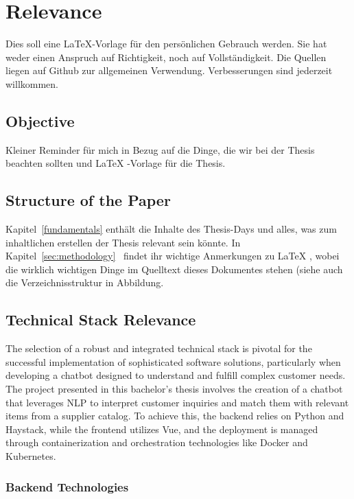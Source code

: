 \section{Relevance}\label{sec:Relevance}
Dies soll eine \LaTeX{}-Vorlage für den persönlichen Gebrauch werden. Sie hat weder einen Anspruch auf Richtigkeit, noch
auf Vollständigkeit. Die Quellen liegen auf Github zur allgemeinen Verwendung. Verbesserungen sind jederzeit willkommen.

\subsection{Objective}\label{subsec:objective}
Kleiner Reminder für mich in Bezug auf die Dinge, die wir bei der Thesis beachten sollten und \LaTeX{}
-Vorlage für die Thesis.

\subsection{Structure of the Paper}\label{subsec:structure-of-the-paper}
Kapitel~\ref{fundamentals}
enthält die Inhalte des Thesis-Days und alles, was zum inhaltlichen erstellen der Thesis relevant sein könnte.
In
Kapitel~\ref{sec:methodology}~ findet ihr wichtige Anmerkungen zu \LaTeX{}
, wobei die wirklich wichtigen Dinge im Quelltext dieses Dokumentes stehen (siehe auch die Verzeichnisstruktur in
Abbildung.

\subsection{Technical Stack Relevance}\label{subsec:technical-stack-relevance}

The selection of a robust and integrated technical stack is pivotal for the successful implementation of sophisticated
software solutions, particularly when developing a chatbot designed to understand and fulfill complex customer needs.
The project presented in this bachelor’s thesis involves the creation of a chatbot that leverages \ac{NLP} to interpret
customer inquiries and match them with relevant items from a supplier catalog. To achieve this, the backend relies on
Python and Haystack, while the frontend utilizes Vue, and the deployment is managed through containerization and
orchestration technologies like Docker and Kubernetes.

\subsubsection{Backend Technologies}

